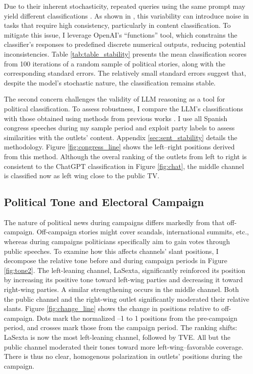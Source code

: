 \documentclass[12pt]{article}
\begin{document}
Due to their inherent stochasticity, repeated queries using the same prompt may yield different classifications \citep{llmstability2024}. As shown in \citep{llmclassification2024}, this variability can introduce noise in tasks that require high consistency, particularly in content classification. To mitigate this issue, I leverage OpenAI’s “functions” tool, which constrains the classifier’s responses to predefined discrete numerical outputs, reducing potential inconsistencies. Table \ref{tab:table_stability} presents the mean classification scores from 100 iterations of a random sample of political stories, along with the corresponding standard errors. The relatively small standard errors suggest that, despite the model’s stochastic nature, the classification remains stable.

The second concern challenges the validity of LLM reasoning as a tool for political classification. To assess robustness, I compare the LLM’s classifications with those obtained using methods from previous works \citep{gentzkow2010media,laver2003extracting}. I use all Spanish congress speeches during my sample period and exploit party labels to assess similarities with the outlets’ content. Appendix \ref{sec:sent_stability} details the methodology. Figure \ref{fig:congress_line} shows the left–right positions derived from this method. Although the overal ranking of the outlets from left to right is consistent to the ChatGPT classification in Figure \ref{fig:chat}, the middle channel is classified now as left wing close to the public TV. 





\subsection*{Political Tone and Electoral Campaign}

The nature of political news during campaigns differs markedly from that off-campaign. Off-campaign stories might cover scandals, international summits, etc., whereas during campaigns politicians specifically aim to gain votes through public speeches. To examine how this affects channels’ slant positions, I decompose the relative tone before and during campaign periods in Figure \ref{fig:tone2}. The left-leaning channel, LaSexta, significantly reinforced its position by increasing its positive tone toward left-wing parties and decreasing it toward right-wing parties. A similar strengthening occurs in the middle channel. Both the public channel and the right-wing outlet significantly moderated their relative slants. Figure \ref{fig:change_line} shows the change in positions relative to off-campaign. Dots mark the normalized –1 to 1 positions from the pre-campaign period, and crosses mark those from the campaign period. The ranking shifts: LaSexta is now the most left-leaning channel, followed by TVE. All but the public channel moderated their tones toward more left-wing–favorable coverage. There is thus no clear, homogenous polarization in outlets' positions during the campaign. 
\end{document}
